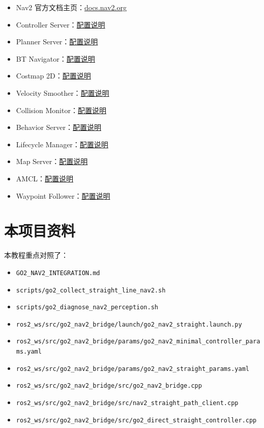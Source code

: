 \documentclass[UTF8,11pt,a4paper,openany]{ctexrep}
\newcommand{\file}[1]{\nolinkurl{#1}}
\begin{document}
\begin{itemize}
  \item Nav2 官方文档主页：\href{https://docs.nav2.org/}{docs.nav2.org}
  \item Controller Server：\href{https://docs.nav2.org/configuration/packages/configuring-controller-server.html}{配置说明}
  \item Planner Server：\href{https://docs.nav2.org/configuration/packages/configuring-planner-server.html}{配置说明}
  \item BT Navigator：\href{https://docs.nav2.org/configuration/packages/configuring-bt-navigator.html}{配置说明}
  \item Costmap 2D：\href{https://docs.nav2.org/configuration/packages/configuring-costmaps.html}{配置说明}
  \item Velocity Smoother：\href{https://docs.nav2.org/configuration/packages/configuring-velocity-smoother.html}{配置说明}
  \item Collision Monitor：\href{https://docs.nav2.org/configuration/packages/collision_monitor/configuring-collision-monitor-node.html}{配置说明}
  \item Behavior Server：\href{https://docs.nav2.org/configuration/packages/configuring-behavior-server.html}{配置说明}
  \item Lifecycle Manager：\href{https://docs.nav2.org/configuration/packages/configuring-lifecycle.html}{配置说明}
  \item Map Server：\href{https://docs.nav2.org/configuration/packages/configuring-map-server.html}{配置说明}
  \item AMCL：\href{https://docs.nav2.org/configuration/packages/configuring-amcl.html}{配置说明}
  \item Waypoint Follower：\href{https://docs.nav2.org/configuration/packages/configuring-waypoint-follower.html}{配置说明}
\end{itemize}

\section{本项目资料}

本教程重点对照了：

\begin{itemize}
  \item \file{GO2_NAV2_INTEGRATION.md}
  \item \file{scripts/go2_collect_straight_line_nav2.sh}
  \item \file{scripts/go2_diagnose_nav2_perception.sh}
  \item \file{ros2_ws/src/go2_nav2_bridge/launch/go2_nav2_straight.launch.py}
  \item \file{ros2_ws/src/go2_nav2_bridge/params/go2_nav2_minimal_controller_params.yaml}
  \item \file{ros2_ws/src/go2_nav2_bridge/params/go2_nav2_straight_params.yaml}
  \item \file{ros2_ws/src/go2_nav2_bridge/src/go2_nav2_bridge.cpp}
  \item \file{ros2_ws/src/go2_nav2_bridge/src/nav2_straight_path_client.cpp}
  \item \file{ros2_ws/src/go2_nav2_bridge/src/go2_direct_straight_controller.cpp}
\end{itemize}
\end{document}
